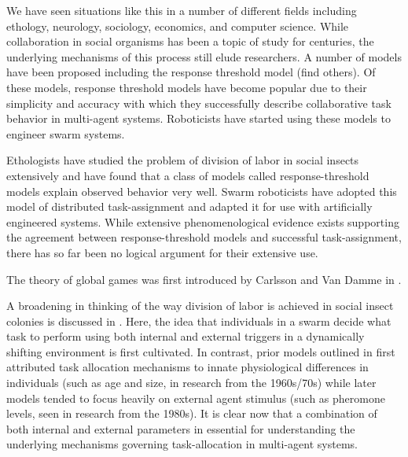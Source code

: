 \documentclass{nature}
\begin{document}
We have seen situations like this in a number of different fields including ethology, neurology, sociology, economics, and computer science. While collaboration in social organisms has been a topic of study for centuries, the underlying mechanisms of this process still elude researchers. A number of models have been proposed including the response threshold model (find others). Of these models, response threshold models have become popular due to their simplicity and accuracy with which they successfully describe collaborative task behavior in multi-agent systems. Roboticists have started using these models to engineer swarm systems.

Ethologists have studied the problem of division of labor in social insects extensively and have found that a class of models called response-threshold models explain observed behavior very well. Swarm roboticists have adopted this model of distributed task-assignment and adapted it for use with artificially engineered systems. While extensive phenomenological evidence exists supporting the agreement between response-threshold models and successful task-assignment, there has so far been no logical argument for their extensive use.



The theory of global games was first introduced by Carlsson and Van Damme in \cite{Carlsson1993}.

A broadening in thinking of the way division of labor is achieved in social insect colonies is discussed in \cite{Gordon1996}. Here, the idea that individuals in a swarm decide what task to perform using both internal and external triggers in a dynamically shifting environment is first cultivated. In contrast, prior models outlined in \cite{Gordon1996} first attributed task allocation mechanisms to innate physiological differences in individuals (such as age and size, in research from the 1960s/70s) while later models tended to focus heavily on external agent stimulus (such as pheromone levels, seen in research from the 1980s). It is clear now that  a combination of both internal and external parameters in essential for understanding the underlying mechanisms governing task-allocation in multi-agent systems.
\end{document}
